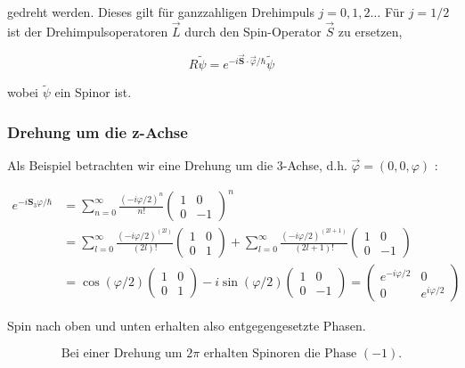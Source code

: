 \documentclass[10pt, letterpaper]{article}
\begin{document}
gedreht werden. Dieses gilt für ganzzahligen Drehimpuls $j=0,1,2 \ldots$ Für $j=1 / 2$ ist der Drehimpulsoperatoren $\vec{L}$ durch den Spin-Operator $\vec{S}$ zu ersetzen,

$$
R \tilde{\psi}=e^{-i \overrightarrow{\mathbf{S}} \cdot \vec{\varphi} / \hbar} \tilde{\psi}
$$

wobei $\tilde{\psi}$ ein Spinor ist.

\subsubsection*{Drehung um die z-Achse}
Als Beispiel betrachten wir eine Drehung um die 3-Achse, d.h. $\vec{\varphi}=(0,0, \varphi)$ :

$$
\begin{aligned}
e^{-i \mathbf{S}_{3} \varphi / \hbar} & =\sum_{n=0}^{\infty} \frac{(-i \varphi / 2)^{n}}{n!}\left(\begin{array}{cc}
1 & 0 \\
0 & -1
\end{array}\right)^{n} \\
& =\sum_{l=0}^{\infty} \frac{(-i \varphi / 2)^{(2 l)}}{(2 l)!}\left(\begin{array}{ll}
1 & 0 \\
0 & 1
\end{array}\right)+\sum_{l=0}^{\infty} \frac{(-i \varphi / 2)^{(2 l+1)}}{(2 l+1)!}\left(\begin{array}{cc}
1 & 0 \\
0 & -1
\end{array}\right) \\
& =\cos (\varphi / 2)\left(\begin{array}{ll}
1 & 0 \\
0 & 1
\end{array}\right)-i \sin (\varphi / 2)\left(\begin{array}{cc}
1 & 0 \\
0 & -1
\end{array}\right)=\left(\begin{array}{cc}
e^{-i \varphi / 2} & 0 \\
0 & e^{i \varphi / 2}
\end{array}\right)
\end{aligned}
$$

Spin nach oben und unten erhalten also entgegengesetzte Phasen.

$$
\text { Bei einer Drehung um } 2 \pi \text { erhalten Spinoren die Phase }(-1) \text {. }
$$
\end{document}
